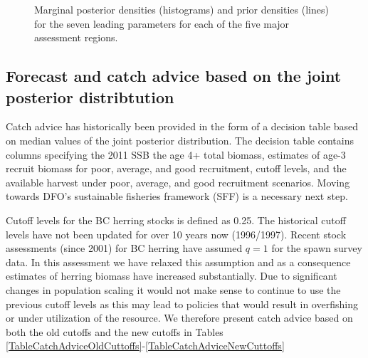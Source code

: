 \begin{figure}[!tbp]

	\caption{Marginal posterior densities (histograms) and prior densities (lines) for the seven leading parameters for each of the five major assessment regions.}\label{PartII:MCMC:Marginals}
\end{figure}



\subsection{Forecast and catch advice based on the joint posterior distribtution} \label{Section:Forecast}

Catch advice has historically been provided in the form of a decision table based on median values of the joint posterior distribution.  The decision table contains columns specifying the 2011 SSB the age 4+ total biomass, estimates of age-3 recruit biomass for poor, average, and good recruitment, cutoff levels, and the available harvest under poor, average, and good recruitment scenarios.  Moving towards DFO's sustainable fisheries framework  (SFF) is a necessary next step.

Cutoff levels for the BC herring stocks is defined as 0.25\bo. The historical cutoff levels have not been updated for over 10 years now (1996/1997).  Recent stock assessments (since 2001) for BC herring have assumed $q=1$ for the spawn survey data.  In this assessment we have relaxed this assumption and as a consequence estimates of herring biomass have increased substantially.  Due to significant changes in population scaling it would not make sense to continue to use the previous cutoff levels as this may lead to policies that would result in overfishing or under utilization of the resource.  We therefore present catch advice based on both the old cutoffs and the new cutoffs in Tables \ref{TableCatchAdviceOldCuttoffs}-\ref{TableCatchAdviceNewCuttoffs} 

